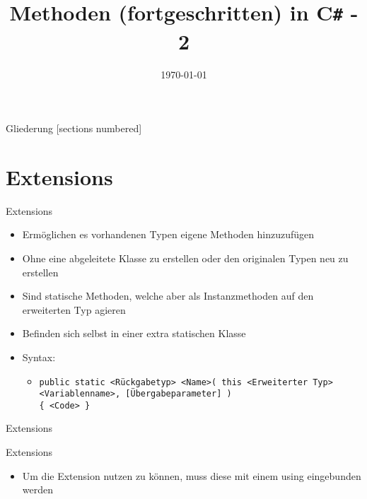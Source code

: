 



\title{Methoden (fortgeschritten) in C\texttt{\#} - 2}
\date{\today}




\maketitle

\begin{frame}{Gliederung}
	[sections numbered]
	\tableofcontents
\end{frame}

\section{Extensions}
\begin{frame}{Extensions}
	\begin{itemize}
		\item Ermöglichen es vorhandenen Typen eigene Methoden hinzuzufügen
		\item Ohne eine abgeleitete Klasse zu erstellen oder den originalen Typen neu zu erstellen
		\item Sind statische Methoden, welche aber als Instanzmethoden auf den erweiterten Typ agieren
		\item Befinden sich selbst in einer extra statischen Klasse
		\item Syntax:
		\begin{itemize}
			\item \texttt{public static \alert{<Rückgabetyp> <Name>}( this \alert{<Erweiterter Typ> <Variablenname>}, \alert{[Übergabeparameter]} )\\ \{ \alert{<Code>} \}}
		\end{itemize}
	\end{itemize}
\end{frame}

\begin{frame}{Extensions}
	
\end{frame}

\begin{frame}{Extensions}
	\begin{itemize}
		\item Um die Extension nutzen zu können, muss diese mit einem \alert{using} eingebunden werden
	\end{itemize}
	
	
\end{frame}

